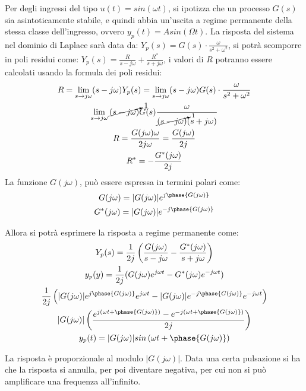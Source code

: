 \documentclass{article}
\numberwithin{equation}{subsection}
\begin{document}
Per degli ingressi del tipo $u(t)=sin(\omega t)$, si ipotizza che un processo $G(s)$ sia asintoticamente stabile, e quindi abbia un'uscita a regime permanente della stessa 
classe dell'ingresso, ovvero $y_p(t)=Asin(\Omega t)$. La risposta del sistema nel dominio di Laplace sarà data da: 
$Y_p(s)=G(s)\cdot\displaystyle\frac{\omega}{s^2+\omega^2}$, si potrà scomporre in poli residui come: $Y_p(s)=\displaystyle\frac{R}{s-j\omega}+\frac{R^*}{s+j\omega}$, i valori 
di $R$ potranno essere calcolati usando la formula dei poli residui: 
\begin{gather}
    R=\lim_{s\to j\omega}(s-j\omega)Y_p(s)=\lim_{s\to j\omega}(s-j\omega)G(s)\cdot\displaystyle\frac{\omega}{s^2+\omega^2}\\
    \lim_{s\to j\omega}\cancelto{1}{(s-j\omega)}G(s)\displaystyle\frac{\omega}{\cancelto{1}{(s-j\omega)}(s+j\omega)}\\
    R=\displaystyle\frac{G(j\omega)\omega}{2j\omega}=\frac{G(j\omega)}{2j}\\
    R^*=-\frac{G^*(j\omega)}{2j}
\end{gather}
La funzione $G(j\omega)$, può essere espressa in termini polari come:
\begin{gather}
    G(j\omega)=|G(j\omega)|e^{j\phase{G(j\omega)}}\\
    G^*(j\omega)=|G(j\omega)|e^{-j\phase{G(j\omega)}}
\end{gather}

Allora si potrà esprimere la risposta a regime permanente come:
\begin{gather}
    Y_p(s)=\displaystyle\frac{1}{2j}\left(\frac{G(j\omega)}{s-j\omega}-\frac{G^*(j\omega)}{s+j\omega}\right)\\
    y_p(y)=\displaystyle\frac{1}{2j}(G(j\omega)e^{j\omega t}-G^*(j\omega)e^{-j\omega t})\\
    \displaystyle\frac{1}{2j}\left(|G(j\omega)|e^{j\phase{G(j\omega)}}e^{j\omega t}-|G(j\omega)|e^{-j\phase{G(j\omega)}}e^{-j\omega t}\right)\\
    |G(j\omega)|\left(\displaystyle\frac{e^{j\left(\omega t+\phase{G(j\omega)}\right)}-e^{-j\left(\omega t+\phase{G(j\omega)}\right)}}{2j}\right)\\
    y_p(t)=|G(j\omega)|sin\left(\omega t+\phase{G(j\omega)}\right)
\end{gather}

La risposta è proporzionale al modulo $|G(j\omega)|$. Data una certa pulsazione si ha che la risposta si annulla, per poi diventare negativa, per cui non si può 
amplificare una frequenza all'infinito. 
\end{document}
